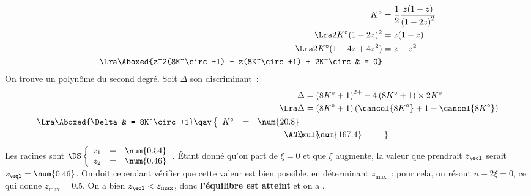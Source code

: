 \documentclass[../TDTM2.tex]{subfiles}%
\begin{document}
{\begin{align*}
		K^\circ                                              & = \frac{1}{2} \frac{z(1-z)}{\left( 1 - 2z \right)^2}
		\\\Lra
		2K^\circ(1-2z)^2                                     & = z(1-z)
		\\\Lra
		2K^\circ(1-4z + 4z^2)                                & = z - z^2
		\\\Lra
		\Aboxed{z^2(8K^\circ +1) - z(8K^\circ +1) + 2K^\circ & = 0}
	\end{align*}
	On trouve un polynôme du second degré. Soit $\Delta$ son discriminant~:
	\begin{align*}
		\Delta         & = \left( 8K^\circ+1 \right)^{2+} -
		4\left(8K^\circ+1\right)\times 2K^\circ
		\\\Lra
		\Delta         & = \left( 8K^\circ+1 \right)\left(
		\cancel{8K^\circ}+1-\cancel{8K^\circ} \right)
		\\\Lra
		\Aboxed{\Delta & = 8K^\circ+1}
		\qav
		\left\{
		\begin{array}{rcl}
			K^\circ & = & \num{20.8}
		\end{array}
		\right.                                             \\
		\makebox[0pt][l]{$\phantom{\AN}\xul{\phantom{\Delta = \num{167.4}}}$}
		\AN
		\Delta         & = \num{167.4}
	\end{align*}
	Les racines sont
	$\DS\left\{
		\begin{array}{rcl}
			z_1 & = & \num{0.54} \\
			z_2 & = & \num{0.46}
		\end{array}
		\right.$.
	\bigbreak
	Étant donné qu'on part de $\xi = 0$ et que $\xi$ augmente, la valeur que
	prendrait $z_{\eql}$ serait $z_{\eql} = \num{0.46}$. On doit cependant
	vérifier que cette valeur est bien possible, en déterminant $z_{\max}$~:
	pour cela, on résout $n-2\xi = 0$, ce qui donne $z_{\max} = \num{0.5}$.
	On a bien $z_{\eql} < z_{\max}$, donc \textbf{l'équilibre est atteint} et
	on a .
}
\end{document}
